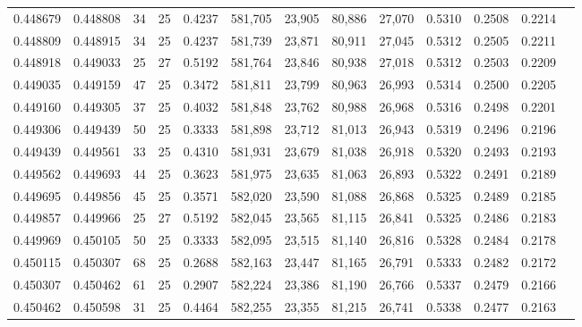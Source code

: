 \begin{tabular}{rrrrrrrrrrrrr}
0.448679 & 0.448808 &    34 &  25 &                                     0.4237 & 581,705 &  23,905 &  80,886 &  27,070 & 0.5310 & 0.2508 & 0.2214 \\
0.448809 & 0.448915 &    34 &  25 &                                     0.4237 & 581,739 &  23,871 &  80,911 &  27,045 & 0.5312 & 0.2505 & 0.2211 \\
0.448918 & 0.449033 &    25 &  27 &                                     0.5192 & 581,764 &  23,846 &  80,938 &  27,018 & 0.5312 & 0.2503 & 0.2209 \\
0.449035 & 0.449159 &    47 &  25 &                                     0.3472 & 581,811 &  23,799 &  80,963 &  26,993 & 0.5314 & 0.2500 & 0.2205 \\
0.449160 & 0.449305 &    37 &  25 &                                     0.4032 & 581,848 &  23,762 &  80,988 &  26,968 & 0.5316 & 0.2498 & 0.2201 \\
0.449306 & 0.449439 &    50 &  25 &                                     0.3333 & 581,898 &  23,712 &  81,013 &  26,943 & 0.5319 & 0.2496 & 0.2196 \\
0.449439 & 0.449561 &    33 &  25 &                                     0.4310 & 581,931 &  23,679 &  81,038 &  26,918 & 0.5320 & 0.2493 & 0.2193 \\
0.449562 & 0.449693 &    44 &  25 &                                     0.3623 & 581,975 &  23,635 &  81,063 &  26,893 & 0.5322 & 0.2491 & 0.2189 \\
0.449695 & 0.449856 &    45 &  25 &                                     0.3571 & 582,020 &  23,590 &  81,088 &  26,868 & 0.5325 & 0.2489 & 0.2185 \\
0.449857 & 0.449966 &    25 &  27 &                                     0.5192 & 582,045 &  23,565 &  81,115 &  26,841 & 0.5325 & 0.2486 & 0.2183 \\
0.449969 & 0.450105 &    50 &  25 &                                     0.3333 & 582,095 &  23,515 &  81,140 &  26,816 & 0.5328 & 0.2484 & 0.2178 \\
0.450115 & 0.450307 &    68 &  25 &                                     0.2688 & 582,163 &  23,447 &  81,165 &  26,791 & 0.5333 & 0.2482 & 0.2172 \\
0.450307 & 0.450462 &    61 &  25 &                                     0.2907 & 582,224 &  23,386 &  81,190 &  26,766 & 0.5337 & 0.2479 & 0.2166 \\
0.450462 & 0.450598 &    31 &  25 &                                     0.4464 & 582,255 &  23,355 &  81,215 &  26,741 & 0.5338 & 0.2477 & 0.2163 \\

\end{tabular}
